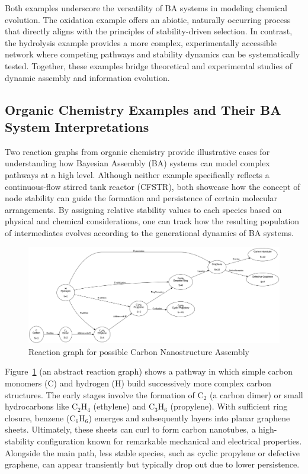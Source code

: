 \documentclass[entropy,article,submit,pdftex,moreauthors]{Definitions/mdpi}
\begin{document}
Both examples underscore the versatility of BA systems in modeling chemical evolution. The oxidation example offers an abiotic, naturally occurring process that directly aligns with the principles of stability-driven selection. In contrast, the hydrolysis example provides a more complex, experimentally accessible network where competing pathways and stability dynamics can be systematically tested. Together, these examples bridge theoretical and experimental studies of dynamic assembly and information evolution.

\subsection{Organic Chemistry Examples and Their BA System Interpretations}
\label{sec:organic-ba-examples}

Two reaction graphs from organic chemistry provide illustrative cases for understanding how Bayesian Assembly (BA) systems can model complex pathways at a high level. Although neither example specifically reflects a continuous-flow stirred tank reactor (CFSTR), both showcase how the concept of node stability can guide the formation and persistence of certain molecular arrangements. By assigning relative stability values to each species based on physical and chemical considerations, one can track how the resulting population of intermediates evolves according to the generational dynamics of BA systems.

\begin{figure}[h]
    \centering
    \includegraphics[width=1\textwidth]{abc_nano.png}
    \caption{Reaction graph for possible Carbon Nanostructure Assembly}
    \label{fig:abc_nano}
\end{figure}

Figure~\ref{fig:abc_nano} (an abstract reaction graph) shows a pathway in which simple carbon monomers (C) and hydrogen (H) build successively more complex carbon structures. The early stages involve the formation of C$_2$ (a carbon dimer) or small hydrocarbons like C$_2$H$_4$ (ethylene) and C$_3$H$_6$ (propylene). With sufficient ring closure, benzene (C$_6$H$_6$) emerges and subsequently layers into planar graphene sheets. Ultimately, these sheets can curl to form carbon nanotubes, a high-stability configuration known for remarkable mechanical and electrical properties. Alongside the main path, less stable species, such as cyclic propylene or defective graphene, can appear transiently but typically drop out due to lower persistence.
\end{document}
